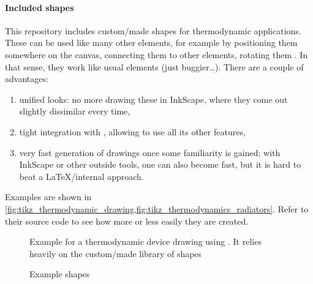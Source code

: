 \paragraph{Included shapes}
This repository includes custom\-/made shapes for thermodynamic applications.
These can be used like many other  elements, for example by
positioning them somewhere on the canvas, connecting them to other elements,
rotating them .
In that sense, they work like usual  elements (just buggier\dots{}).
There are a couple of advantages:
\begin{enumerate}
    \item unified looks: no more drawing these in InkScape, where they come out
          slightly dissimilar every time,
    \item tight integration with , allowing to use all its other
          features,
    \item very fast generation of drawings once some familiarity is gained;
          with InkScape or other outside tools, one can also become fast, but it is
          hard to beat a \LaTeX{}\-/internal approach.
\end{enumerate}
Examples are shown in
\cref{fig:tikz_thermodynamic_drawing,fig:tikz_thermodynamics_radiators}.
Refer to their source code to see how more or less easily they are created.

\begin{figure}[tbp]
    \ContinuedFloat*
    \centering
    \caption{%
        Example for a thermodynamic device drawing using .
        It relies heavily on the custom\-/made library of shapes%
    }
    \label{fig:tikz_thermodynamic_drawing}
\end{figure}

\begin{figure}[tbp]

    \centering
    \caption{Example  shapes}
    \label{fig:tikz_thermodynamics_radiators}
\end{figure}

